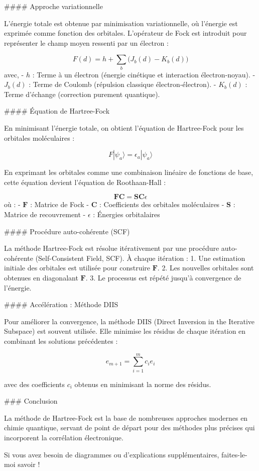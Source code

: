 \documentclass[12pt,a4paper]{report}
\begin{document}
\begin{markdown}
#### Approche variationnelle

L’énergie totale est obtenue par minimisation variationnelle, où l'énergie est exprimée comme fonction des orbitales. L'opérateur de Fock est introduit pour représenter le champ moyen ressenti par un électron :

\[
F(d) = h + \sum_{b} \big(J_b(d) - K_b(d)\big)
\]
avec,
- \(h\) : Terme à un électron (énergie cinétique et interaction électron-noyau).
- \(J_b(d)\) : Terme de Coulomb (répulsion classique électron-électron).
- \(K_b(d)\) : Terme d'échange (correction purement quantique).

#### Équation de Hartree-Fock

En minimisant l'énergie totale, on obtient l'équation de Hartree-Fock pour les orbitales moléculaires :

\[
F|\psi_a\rangle = \epsilon_a|\psi_a\rangle
\]

En exprimant les orbitales comme une combinaison linéaire de fonctions de base, cette équation devient l'équation de Roothaan-Hall :

\[
\mathbf{F}\mathbf{C} = \mathbf{S}\mathbf{C}\epsilon
\]
où :
- \(\mathbf{F}\) : Matrice de Fock
- \(\mathbf{C}\) : Coefficients des orbitales moléculaires
- \(\mathbf{S}\) : Matrice de recouvrement
- \(\epsilon\) : Énergies orbitalaires

#### Procédure auto-cohérente (SCF)

La méthode Hartree-Fock est résolue itérativement par une procédure auto-cohérente (Self-Consistent Field, SCF). À chaque itération :
1. Une estimation initiale des orbitales est utilisée pour construire \(\mathbf{F}\).
2. Les nouvelles orbitales sont obtenues en diagonalant \(\mathbf{F}\).
3. Le processus est répété jusqu'à convergence de l'énergie.

#### Accélération : Méthode DIIS

Pour améliorer la convergence, la méthode DIIS (Direct Inversion in the Iterative Subspace) est souvent utilisée. Elle minimise les résidus de chaque itération en combinant les solutions précédentes :

\[
e_{m+1} = \sum_{i=1}^m c_i e_i
\]

avec des coefficients \(c_i\) obtenus en minimisant la norme des résidus.

### Conclusion

La méthode de Hartree-Fock est la base de nombreuses approches modernes en chimie quantique, servant de point de départ pour des méthodes plus précises qui incorporent la corrélation électronique.

Si vous avez besoin de diagrammes ou d'explications supplémentaires, faites-le-moi savoir !

\end{markdown}
\end{document}
